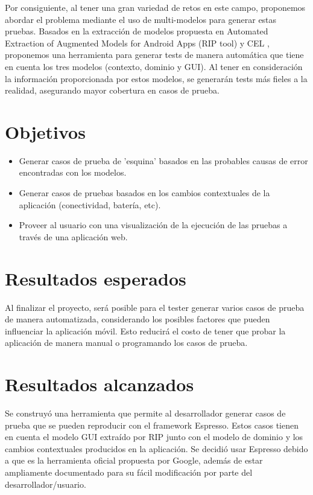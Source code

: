 Por consiguiente, al tener una gran variedad de retos en este campo, proponemos abordar el problema mediante el uso de multi-modelos para generar estas pruebas. Basados en la extracción de modelos propuesta en Automated Extraction of Augmented Models for Android Apps (RIP tool) \cite{LinanAutomatedApps} y CEL \cite{Linares-Vasquez2017ContinuousTesting}, proponemos una herramienta para generar tests de manera automática que tiene en cuenta los tres modelos (contexto, dominio y GUI). Al tener en consideración la información proporcionada por estos modelos, se generarán tests más fieles a la realidad, asegurando mayor cobertura en casos de prueba.

\section{Objetivos}

\begin{itemize}
	\item Generar casos de prueba de 'esquina' basados en las probables causas de error encontradas con los modelos.
	\item Generar casos de pruebas basados en los cambios contextuales de la aplicación (conectividad, batería, etc).
	\item Proveer al usuario con una visualización de la ejecución de las pruebas a través de una aplicación web.
\end{itemize}

\section{Resultados esperados}
Al finalizar el proyecto, será posible para el tester generar varios casos de prueba de manera automatizada, considerando los posibles factores que pueden influenciar la aplicación móvil. Esto reducirá el costo de tener que probar la aplicación de manera manual o programando los casos de prueba.
\section{Resultados alcanzados}
Se construyó una herramienta que permite al desarrollador generar casos de prueba que se pueden reproducir con el framework Espresso. Estos casos tienen en cuenta el modelo GUI extraído por RIP junto con el modelo de dominio y los cambios contextuales producidos en la aplicación. Se decidió usar Espresso debido a que es la herramienta oficial propuesta por Google, además de estar ampliamente documentado para su fácil modificación por parte del desarrollador/usuario.

